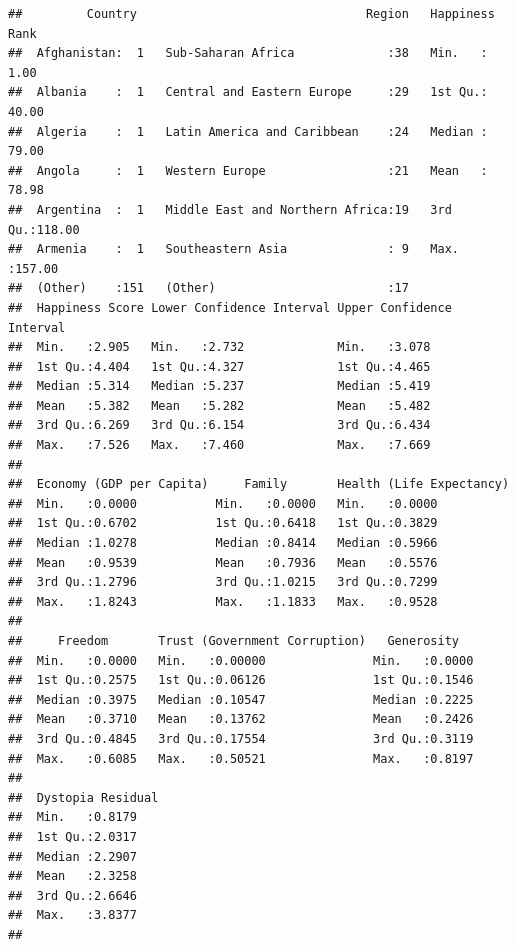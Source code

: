 \documentclass[]{book}
\begin{document}
\begin{verbatim}
##         Country                                Region   Happiness Rank  
##  Afghanistan:  1   Sub-Saharan Africa             :38   Min.   :  1.00  
##  Albania    :  1   Central and Eastern Europe     :29   1st Qu.: 40.00  
##  Algeria    :  1   Latin America and Caribbean    :24   Median : 79.00  
##  Angola     :  1   Western Europe                 :21   Mean   : 78.98  
##  Argentina  :  1   Middle East and Northern Africa:19   3rd Qu.:118.00  
##  Armenia    :  1   Southeastern Asia              : 9   Max.   :157.00  
##  (Other)    :151   (Other)                        :17                   
##  Happiness Score Lower Confidence Interval Upper Confidence Interval
##  Min.   :2.905   Min.   :2.732             Min.   :3.078            
##  1st Qu.:4.404   1st Qu.:4.327             1st Qu.:4.465            
##  Median :5.314   Median :5.237             Median :5.419            
##  Mean   :5.382   Mean   :5.282             Mean   :5.482            
##  3rd Qu.:6.269   3rd Qu.:6.154             3rd Qu.:6.434            
##  Max.   :7.526   Max.   :7.460             Max.   :7.669            
##                                                                     
##  Economy (GDP per Capita)     Family       Health (Life Expectancy)
##  Min.   :0.0000           Min.   :0.0000   Min.   :0.0000          
##  1st Qu.:0.6702           1st Qu.:0.6418   1st Qu.:0.3829          
##  Median :1.0278           Median :0.8414   Median :0.5966          
##  Mean   :0.9539           Mean   :0.7936   Mean   :0.5576          
##  3rd Qu.:1.2796           3rd Qu.:1.0215   3rd Qu.:0.7299          
##  Max.   :1.8243           Max.   :1.1833   Max.   :0.9528          
##                                                                    
##     Freedom       Trust (Government Corruption)   Generosity    
##  Min.   :0.0000   Min.   :0.00000               Min.   :0.0000  
##  1st Qu.:0.2575   1st Qu.:0.06126               1st Qu.:0.1546  
##  Median :0.3975   Median :0.10547               Median :0.2225  
##  Mean   :0.3710   Mean   :0.13762               Mean   :0.2426  
##  3rd Qu.:0.4845   3rd Qu.:0.17554               3rd Qu.:0.3119  
##  Max.   :0.6085   Max.   :0.50521               Max.   :0.8197  
##                                                                 
##  Dystopia Residual
##  Min.   :0.8179   
##  1st Qu.:2.0317   
##  Median :2.2907   
##  Mean   :2.3258   
##  3rd Qu.:2.6646   
##  Max.   :3.8377   
## 
\end{verbatim}
\end{document}
